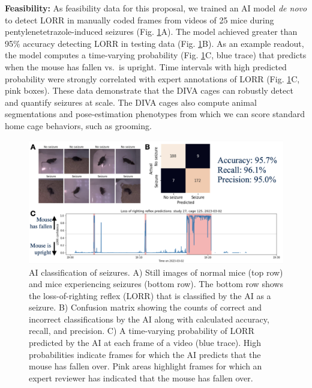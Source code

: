 \documentclass[
  12pt,
]{article}
\begin{document}
\textbf{Feasibility:} As feasibility data for this proposal, we trained
an AI model \textit{de novo} to detect LORR in manually coded frames
from videos of 25 mice during pentylenetetrazole-induced seizures (Fig.
\ref{fig:LORR}A). The model achieved greater than 95\% accuracy
detecting LORR in testing data (Fig. \ref{fig:LORR}B). As an example
readout, the model computes a time-varying probability (Fig.
\ref{fig:LORR}C, blue trace) that predicts when the mouse has fallen
vs.~is upright. Time intervals with high predicted probability were
strongly correlated with expert annotations of LORR (Fig.
\ref{fig:LORR}C, pink boxes). These data demonstrate that the DIVA cages
can robustly detect and quantify seizures at scale. The DIVA cages also
compute animal segmentations and pose-estimation phenotypes from which
we can score standard home cage behaviors, such as grooming.

\begin{figure}[ht!]
\includegraphics[width=\textwidth]{Fig3.png} 
\caption{AI classification of seizures. A) Still images of normal mice (top row) and mice experiencing seizures (bottom row). The bottom row shows the loss-of-righting reflex (LORR) that is classified by the AI as a seizure. B) Confusion matrix showing the counts of correct and incorrect classifications by the AI along with calculated accuracy, recall, and precision. C) A time-varying probability of LORR predicted by the AI at each frame of a video (blue trace). High probabilities indicate frames for which the AI predicts that the mouse has fallen over. Pink areas highlight frames for which an expert reviewer has indicated that the mouse has fallen over.}
\label{fig:LORR}
\end{figure}
\end{document}
